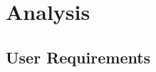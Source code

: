 \documentclass[ucs,10pt]{beamer}
\begin{document}


\section{Analysis}

\subsection{User Requirements}
\end{document}
